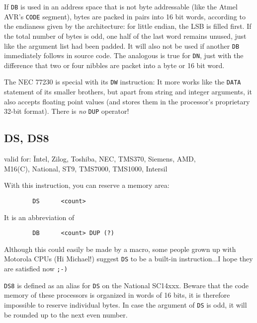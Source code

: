 \documentclass[12pt,twoside]{report}
\makeatletter
\newcommand{\tty}[1]{{\tt #1}}
\newcommand{\ttindex}[1]{\index{#1@{\tt #1}}}
\makeatother
\begin{document}
If \tty{DB} is used in an address space that is not byte addressable (like
the Atmel AVR's \tty{CODE} segment), bytes are packed in pairs into 16 bit
words, according to the endianess given by the architecture: for little
endian, the LSB is filled first.  If the total number of bytes is odd, one
half of the last word remains unused, just like the argument list had been
padded.  It will also not be used if another \tty{DB} immediately follows
in source code.  The analogous is true for \tty{DN}, just with the difference
that two or four nibbles are packet into a byte or 16 bit word.

The NEC 77230 is special with its \tty{DW} instruction: It more works like
the \tty{DATA} statement of its smaller brothers, but apart from string
and integer arguments, it also accepts floating point values (and stores
them in the processor's proprietary 32-bit format). There is {\em no}
\tty{DUP} operator!


\subsection{DS, DS8}
\ttindex{DS}
\ttindex{DS8}

{\em\begin{tabbing}
valid for: \= Intel, Zilog, Toshiba, NEC, TMS370, Siemens, AMD, \\
           \> M16(C), National, ST9, TMS7000, TMS1000, Intersil
\end{tabbing}}

With this instruction, you can reserve a memory area:
\begin{verbatim}
        DS      <count>
\end{verbatim}
It is an abbreviation of
\begin{verbatim}
        DB      <count> DUP (?)
\end{verbatim}
Although this could easily be made by a macro, some people grown up
with Motorola CPUs (Hi Michael!) suggest \tty{DS} to be a built-in
instruction...I hope they are satisfied now \tty{;-)}

{\tt DS8} is defined as an alias for {\tt DS} on the National SC14xxx.
Beware that the code memory of these processors is organized in words of
16 bits, it is therefore impossible to reserve individual bytes.  In case
the argument of {\tt DS} is odd, it will be rounded up to the next even
number.
\end{document}

